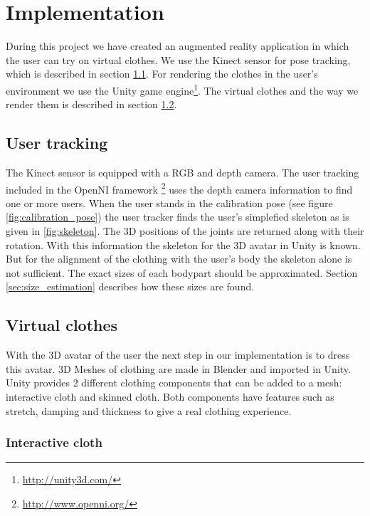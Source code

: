 \documentclass[a4paper]{article}
\begin{document}
\section{Implementation}
\label{sec:implementation}

During this project we have created an augmented reality application in which the user can try on virtual clothes. We use the Kinect sensor for pose tracking, which is described in section \ref{sec:user_tracking}. For rendering the clothes in the user's environment we use the Unity game engine\footnote{\url{http://unity3d.com/}}. The virtual clothes and the way we render them is described in section \ref{sec:virtual_clothes}.



\subsection{User tracking}
\label{sec:user_tracking}

The Kinect sensor is equipped with a RGB and depth camera. The user tracking included in the OpenNI framework \footnote{\url{http://www.openni.org/}} uses the depth camera information to find one or more users. When the user stands in the calibration pose (see figure \ref{fig:calibration_pose}) the user tracker finds the user's simplefied skeleton as is given in \ref{fig:skeleton}. The 3D positions of the joints are returned along with their rotation. With this information the skeleton for the 3D avatar in Unity is known. But for the alignment of the clothing with the user's body the skeleton alone is not sufficient. The exact sizes of each bodypart should be approximated. Section \ref{sec:size_estimation} describes how these sizes are found.


\subsection{Virtual clothes}
\label{sec:virtual_clothes}
With the 3D avatar of the user the next step in our implementation is to dress this avatar. 3D Meshes of clothing are made in Blender and imported in Unity. Unity provides 2 different clothing components that can be added to a mesh: interactive cloth and skinned cloth. Both components have features such as stretch, damping and thickness to give a real clothing experience.

\subsubsection{Interactive cloth}
\end{document}
